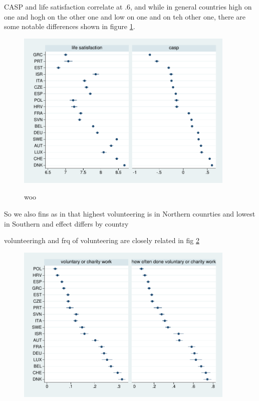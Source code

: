 \documentclass[10pt, letterpaper]{article}
\begin{document}
\begin{spacing}{1.4}
CASP and life satisfaction correlate at .6, and while in general countries high
on one and hogh on the other one and low on one and on teh other one, there are
some notable differences shown in figure \ref{ls-casp-means}.

\begin{figure}[H]
 \includegraphics[height=3in]{tmp/ls-casp-means.pdf}\centering\label{ls-casp-means}
\caption{woo}
\end{figure}

So we also fins as in \citet{haski09} that highest volunteering is in Northern
counrties and lowest in Southern and effect differs by country

volunteeringh and frq of volunteering are closely related in fig \ref{volCha-volChaOft-means}

\begin{figure}[H]
 \includegraphics[height=3in]{tmp/volCha-volChaOft-means.pdf}\centering\label{volCha-volChaOft-means}
\caption{}
\end{figure}




\end{spacing}
\end{document}
